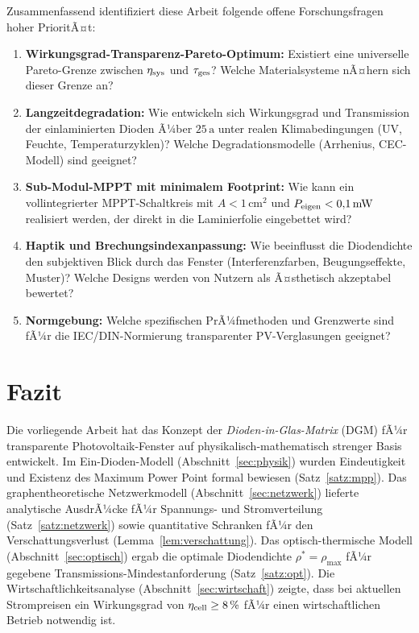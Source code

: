 ﻿\documentclass[a4paper,12pt]{article}
\theoremstyle{definition}
\theoremstyle{remark}
\begin{document}
Zusammenfassend identifiziert diese Arbeit folgende offene Forschungsfragen
hoher PrioritÃ¤t:

\begin{enumerate}
  \item \textbf{Wirkungsgrad-Transparenz-Pareto-Optimum:} Existiert eine
    universelle Pare\-to-Grenze zwischen $\eta_{\rm sys}$ und $\tau_{\rm ges}$?
    Welche Materialsysteme nÃ¤hern sich dieser Grenze an?

  \item \textbf{Langzeitdegradation:} Wie entwickeln sich Wirkungsgrad
    und Transmission der einlaminierten Dioden Ã¼ber $25\,\mathrm{a}$
    unter realen Klimabedingungen (UV, Feuchte, Temperaturzyklen)?
    Welche Degradationsmodelle (Arrhenius, CEC-Modell) sind geeignet?

  \item \textbf{Sub-Modul-MPPT mit minimalem Footprint:} Wie kann ein
    vollintegrierter MPPT-Schaltkreis mit $A < 1\,\mathrm{cm^2}$
    und $P_{\rm eigen} < 0{,}1\,\mathrm{mW}$ realisiert werden,
    der direkt in die Laminierfolie eingebettet wird?

  \item \textbf{Haptik und Brechungsindexanpassung:} Wie beeinflusst
    die Diodendichte den subjektiven Blick durch das Fenster
    (Interferenzfarben, Beugungseffekte, Muster)? Welche Designs
    werden von Nutzern als Ã¤sthetisch akzeptabel bewertet?

  \item \textbf{Normgebung:} Welche spezifischen PrÃ¼fmethoden und
    Grenzwerte sind fÃ¼r die IEC/DIN-Normierung transparenter
    PV-Verglasungen geeignet?
\end{enumerate}

\section{Fazit}
\label{sec:fazit}

Die vorliegende Arbeit hat das Konzept der \emph{Dioden-in-Glas-Matrix}
(DGM) fÃ¼r transparente Photovoltaik-Fenster auf physikalisch-mathematisch
strenger Basis entwickelt. Im Ein-Dioden-Modell (Abschnitt~\ref{sec:physik})
wurden Eindeutigkeit und Existenz des Maximum Power Point formal bewiesen
(Satz~\ref{satz:mpp}). Das graphentheoretische Netzwerkmodell
(Abschnitt~\ref{sec:netzwerk}) lieferte analytische AusdrÃ¼cke fÃ¼r
Spannungs- und Stromverteilung (Satz~\ref{satz:netzwerk}) sowie
quantitative Schranken fÃ¼r den Verschattungsverlust
(Lemma~\ref{lem:verschattung}). Das optisch-thermische Modell
(Abschnitt~\ref{sec:optisch}) ergab die optimale Diodendichte
$\rho^* = \rho_{\max}$ fÃ¼r gegebene Transmissions-Mindestanforderung
(Satz~\ref{satz:opt}). Die Wirtschaftlichkeitsanalyse
(Abschnitt~\ref{sec:wirtschaft}) zeigte, dass bei aktuellen Strompreisen
ein Wirkungsgrad von $\eta_{\rm cell} \geq 8\,\%$ fÃ¼r einen wirtschaftlichen
Betrieb notwendig ist.
\end{document}
